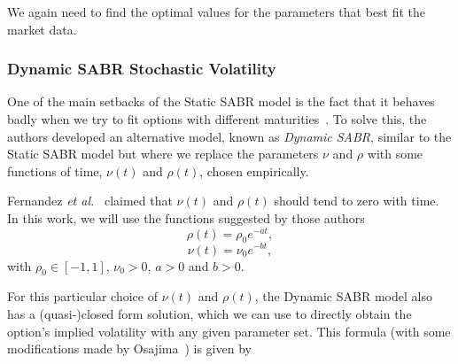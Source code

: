 We again need to find the optimal values for the parameters that best fit the market data.

\vspace{5pt}
\subsubsection{Dynamic SABR Stochastic Volatility}
One of the main setbacks of the Static SABR model is the fact that it behaves badly when we try to fit options with different maturities~\citep{Hagan}. To solve this, the authors developed an alternative model, known as \emph{Dynamic SABR}, similar to the Static SABR model but where we replace the parameters $\nu$ and $\rho$ with some functions of time, $\nu(t)$ and $\rho(t)$, chosen empirically.

Fernandez \textit{et al.}~\citep{Fernandez} claimed that $\nu(t)$ and $\rho(t)$ should tend to zero with time. In this work, we will use the functions suggested by those authors
\begin{equation}\label{rhot}
\rho(t)=\rho_0e^{-at},
\end{equation}
\begin{equation}\label{nut}
\nu(t)=\nu_0e^{-bt},
\end{equation}
\noindent with $\rho_0\in[-1,1]$, $\nu_0>0$, $a>0$ and $b>0$.

For this particular choice of $\nu(t)$ and $\rho(t)$, the Dynamic SABR model also has a (quasi-)closed form solution, which we can use to directly obtain the option's implied volatility with any given parameter set. This formula (with some modifications made by Osajima~\citep{Osajima}) is given by 

